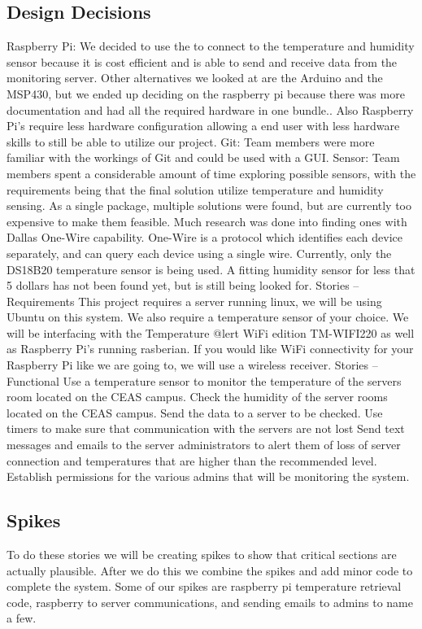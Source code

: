 \documentclass{report}
\begin{document}
\newpage

	
\subsection*{Design Decisions}
Raspberry Pi: We decided to use the to connect to the temperature and humidity sensor because it is cost efficient and is able to send and receive data from the monitoring server. Other alternatives we looked at are the Arduino and the MSP430, but we ended up deciding on the raspberry pi because there was more documentation and had all the required hardware in one bundle.. Also Raspberry Pi’s require less hardware configuration allowing a end user with less hardware skills to still be able to utilize our project.
Git: Team members were more familiar with the workings of Git and could be used with a GUI.
Sensor: Team members spent a considerable amount of time exploring possible sensors, with the requirements being that the final solution utilize temperature and humidity sensing. As a single package, multiple solutions were found, but are currently too expensive to make them feasible. Much research was done into finding ones with Dallas One-Wire capability. One-Wire is a protocol which identifies each device separately, and can query each device using a single wire. Currently, only the DS18B20 temperature sensor is being used. A fitting humidity sensor for less that 5 dollars has not been found yet, but is still being looked for.
Stories -- Requirements
	This project requires a server running linux, we will be using Ubuntu on this system. We also require a temperature sensor of your choice. We will be interfacing with the Temperature @lert WiFi edition TM-WIFI220 as well as Raspberry Pi’s running rasberian. If you would like WiFi connectivity for your Raspberry Pi like we are going to, we will use a wireless receiver.
Stories -- Functional
Use a temperature sensor to monitor the temperature of the servers room located on the CEAS campus.
Check the humidity of the server rooms located on the CEAS campus.
Send the data to a server to be checked.
Use timers to make sure that communication with the servers are not lost
Send text messages and emails to the server administrators to alert them of loss of server connection and temperatures that are higher than the recommended level.
Establish permissions for the various admins that will be monitoring the system.

\newpage
\subsection*{Spikes}
	To do these stories we will be creating spikes to show that critical sections are actually plausible. After we do this we combine the spikes and add minor code to complete the system. Some of our spikes are raspberry pi temperature retrieval code, raspberry to server communications, and sending emails to admins to name a few. 
\newpage
\end{document}
